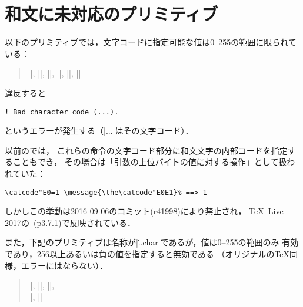 \documentclass[a4paper,11pt,nomag,dvipdfmx]{jsarticle}
\begin{document}
\section{和文に未対応のプリミティブ}
以下のプリミティブでは，文字コードに指定可能な値は0--255の範囲に限られている：
\begin{quote}
 |\catcode|,
 |\sfcode|,
 |\mathcode|,
 |\delcode|,
 |\lccode|,
 |\uccode|
\end{quote}
違反すると
\begin{verbatim}
! Bad character code (...).
\end{verbatim}
というエラーが発生する（|...|はその文字コード）．
\begin{dangerous}
以前の\pTeX では，
これらの命令の文字コード部分に和文文字の内部コードを指定することもでき，
その場合は「引数の上位バイトの値に対する操作」として扱われていた：
\begin{verbatim}
\catcode"E0=1 \message{\the\catcode"E0E1}% ==> 1
\end{verbatim}
しかしこの挙動は2016-09-06のコミット(r41998)により禁止され，
\TeX~Live 2017の\pTeX~(p3.7.1)で反映されている．
\end{dangerous}

また，下記のプリミティブは名称が|\...char|であるが，値は0--255の範囲のみ
有効であり，256以上あるいは負の値を指定すると無効である
（オリジナルの\TeX 同様，エラーにはならない）．
\begin{quote}
 |\endlinechar|,
 |\newlinechar|,
 |\escapechar|,\\
 ||,
 ||
\end{quote}

\end{document}
